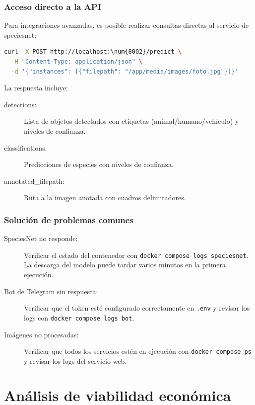 \documentclass[a4paper, 12pt]{report}
\begin{document}
\subsection{Acceso directo a la API}

Para integraciones avanzadas, es posible realizar consultas directas
al servicio de \gls{speciesnet}:

\begin{lstlisting}[language=bash, caption={Ejemplo de consulta directa a la API de SpeciesNet.}]
  curl -X POST http://localhost:\num{8002}/predict \
  -H "Content-Type: application/json" \
  -d '{"instances": [{"filepath": "/app/media/images/foto.jpg"}]}'
\end{lstlisting}

La respuesta incluye:

\begin{description}
  \item[detections:] Lista de objetos detectados con etiquetas
    (animal/humano/vehículo) y niveles de confianza.
  \item[classifications:] Predicciones de especies con niveles
    de confianza.
  \item[annotated\_filepath:] Ruta a la imagen anotada con
    cuadros delimitadores.
\end{description}

\subsection{Solución de problemas comunes}

\begin{description}
  \item[SpeciesNet no responde:] Verificar el estado del contenedor
    con \texttt{docker compose\allowbreak\ logs\allowbreak\ speciesnet}.
    La descarga del modelo puede tardar varios minutos en la primera
    ejecución.
  \item[Bot de Telegram sin respuesta:] Verificar que el token
    esté configurado correctamente en \texttt{.env} y revisar
    los logs con \texttt{docker compose\allowbreak\ logs\allowbreak\ bot}.
  \item[Imágenes no procesadas:] Verificar que todos los servicios
    estén en ejecución con \texttt{docker compose\allowbreak\ ps}
    y revisar los logs del servicio web.
\end{description}

\chapter{Análisis de viabilidad económica}
\end{document}
